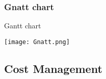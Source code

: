 \subsubsection{Gnatt chart}
\begin{table}[H]
\caption{Gantt chart}
\begin{center}
	\texttt{[image: Gnatt.png]}
\end{center}	
\end{table}
\subsection{Cost Management}






